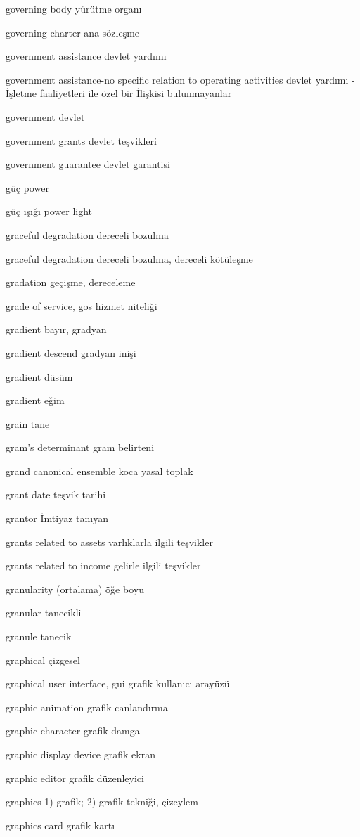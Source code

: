 \documentclass[12pt,fleqn]{article}\usepackage{../../common}
\begin{document}
governing body yürütme organı

governing charter ana sözleşme

government assistance devlet yardımı

government assistance-no specific relation to operating activities devlet yardımı - İşletme faaliyetleri ile özel bir İlişkisi bulunmayanlar

government devlet

government grants devlet teşvikleri

government guarantee devlet garantisi

güç power

güç ışığı power light

graceful degradation dereceli bozulma

graceful degradation dereceli bozulma, dereceli kötüleşme

gradation geçişme, dereceleme

grade of service, gos hizmet niteliği

gradient bayır, gradyan

gradient descend gradyan inişi

gradient düsüm

gradient eğim

grain tane

gram's determinant gram belirteni

grand canonical ensemble koca yasal toplak

grant date teşvik tarihi

grantor İmtiyaz tanıyan

grants related to assets varlıklarla ilgili teşvikler

grants related to income gelirle ilgili teşvikler

granularity (ortalama) öğe boyu

granular tanecikli

granule tanecik

graphical çizgesel

graphical user interface, gui grafik kullanıcı arayüzü

graphic animation grafik canlandırma

graphic character grafik damga

graphic display device grafik ekran

graphic editor grafik düzenleyici

graphics 1) grafik; 2) grafik tekniği, çizeylem

graphics card grafik kartı
\end{document}
